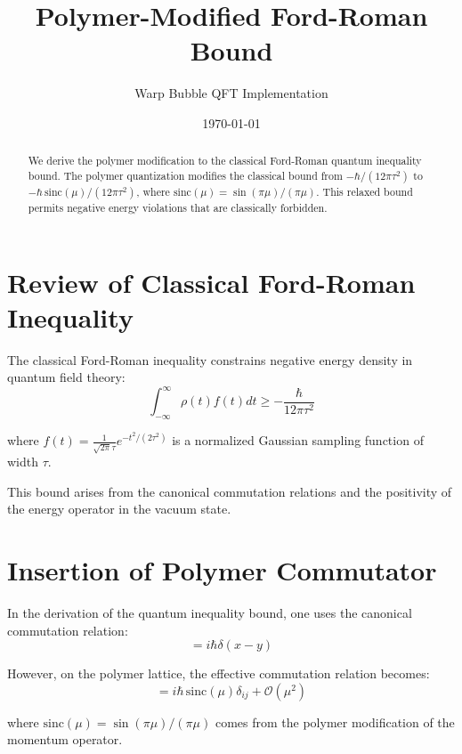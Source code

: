 \documentclass[11pt]{article}
\title{Polymer-Modified Ford-Roman Bound}
\author{Warp Bubble QFT Implementation}
\date{\today}
\begin{document}
\maketitle

\begin{abstract}
We derive the polymer modification to the classical Ford-Roman quantum inequality bound. The polymer quantization modifies the classical bound from $-\hbar/(12\pi\tau^2)$ to $-\hbar\,\mathrm{sinc}(\mu)/(12\pi\tau^2)$, where $\mathrm{sinc}(\mu) = \sin(\pi\mu)/(\pi\mu)$. This relaxed bound permits negative energy violations that are classically forbidden.
\end{abstract}

\section{Review of Classical Ford-Roman Inequality}

The classical Ford-Roman inequality constrains negative energy density in quantum field theory:
\begin{equation}
\int_{-\infty}^{\infty} \rho(t) f(t) dt \geq -\frac{\hbar}{12\pi\tau^2}
\end{equation}

where $f(t) = \frac{1}{\sqrt{2\pi}\tau} e^{-t^2/(2\tau^2)}$ is a normalized Gaussian sampling function of width $\tau$.

This bound arises from the canonical commutation relations and the positivity of the energy operator in the vacuum state.

\section{Insertion of Polymer Commutator}

In the derivation of the quantum inequality bound, one uses the canonical commutation relation:
\begin{equation}
[\hat{\phi}(x), \hat{\pi}(y)] = i\hbar\delta(x-y)
\end{equation}

However, on the polymer lattice, the effective commutation relation becomes:
\begin{equation}
[\hat{\phi}_i, \hat{\pi}_j^{\rm poly}] = i\hbar\,\mathrm{sinc}(\mu)\delta_{ij} + \mathcal{O}(\mu^2)
\end{equation}

where $\mathrm{sinc}(\mu) = \sin(\pi\mu)/(\pi\mu)$ comes from the polymer modification of the momentum operator.
\end{document}
